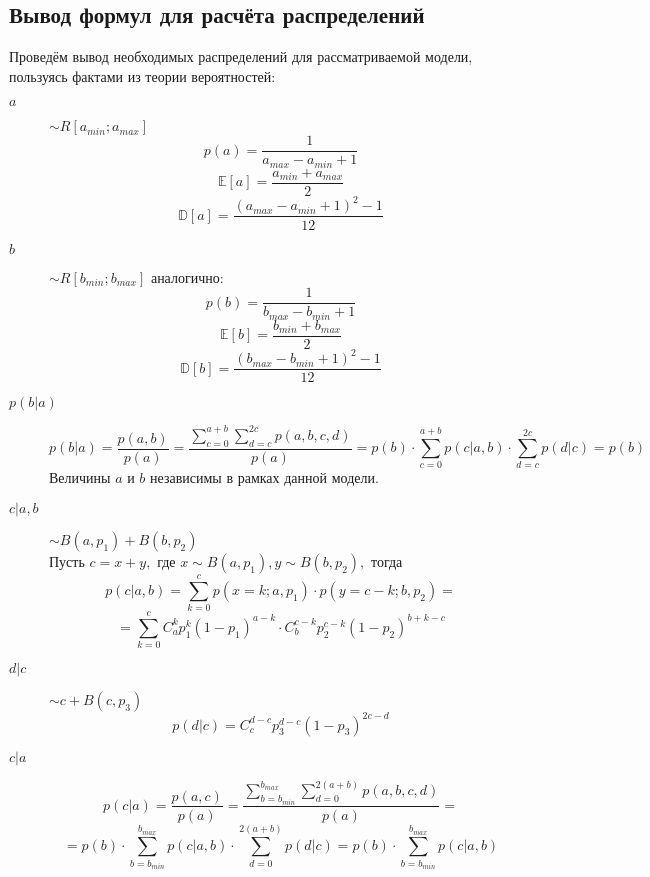 \documentclass[12pt,a4paper,oneside,fleqn,leqno]{article}
\begin{document}
		\subsection{Вывод формул для расчёта распределений}
			Проведём вывод необходимых распределений для рассматриваемой модели, пользуясь фактами из теории вероятностей:
			\begin{description}
				\item[$a$]
				$\sim R[a_{min}; a_{max}]$\\
				$$p(a) = \frac{1}{a_{max} - a_{min} + 1}$$
				$$\mathbb{E}[a] = \frac{a_{min} + a_{max}}{2}$$
				$$\mathbb{D}[a] = \frac{(a_{max} - a_{min} + 1)^2 - 1}{12}$$
				\noindent\makebox[\linewidth]{\rule{\textwidth}{0.4pt}}
				\item[$b$]
				$\sim R[b_{min}; b_{max}]$ аналогично:\\
				$$p(b) = \frac{1}{b_{max} - b_{min} + 1}$$
				$$\mathbb{E}[b] = \frac{b_{min} + b_{max}}{2}$$
				$$\mathbb{D}[b] = \frac{(b_{max} - b_{min} + 1)^2 - 1}{12}$$
				\noindent\makebox[\linewidth]{\rule{\textwidth}{0.4pt}}
				\item[$p(b|a)$]
				$$ p(b|a) = \frac{p(a, b)}{p(a)} = \frac{\sum\limits_{c = 0}^{a + b} \sum\limits_{d = c}^{2c} p(a, b, c, d)}{p(a)} = p(b) \cdot \sum\limits_{c = 0}^{a + b} p(c|a, b) \cdot \sum\limits_{d = c}^{2c} p(d|c) = p(b)$$
				Величины $a$ и $b$ независимы в рамках данной модели.\\
				\noindent\makebox[\linewidth]{\rule{\textwidth}{0.4pt}}
				\item[$c|a,b$]
				$\sim B(a, p_1) + B(b, p_2)$\\
				Пусть $c = x + y,$ где $x \sim B(a, p_1), y \sim B(b, p_2),$ тогда
				$$p(c|a,b) = \sum_{k = 0}^c p(x = k; a, p_1) \cdot p(y = c - k; b, p_2) = $$ $$
				=\sum_{k = 0}^c C_a^k p_1^k (1 - p_1)^{a - k} \cdot C_b^{c - k} p_2^{c - k} (1 - p_2)^{b + k - c}$$
				\noindent\makebox[\linewidth]{\rule{\textwidth}{0.4pt}}
				\item[$d|c$]
				$\sim c + B(c, p_3)$
				$$ p(d|c) = C_{c}^{d - c}p_3^{d - c}(1 - p_3)^{2c - d}$$
				\noindent\makebox[\linewidth]{\rule{\textwidth}{0.4pt}}
				\item[$c|a$]
				$$p(c|a) = \frac{p(a, c)}{p(a)} = \frac{\sum\limits_{b = b_{min}}^{b_{max}} \sum\limits_{d = 0}^{2(a + b)}p(a, b, c, d) }{p(a)} = $$ $$ = p(b) \cdot \sum\limits_{b = b_{min}}^{b_{max}} p(c|a, b) \cdot \sum\limits_{d = 0}^{2(a + b)}p(d|c) = p(b) \cdot \sum\limits_{b = b_{min}}^{b_{max}} p(c|a, b)$$
				\noindent\makebox[\linewidth]{\rule{\textwidth}{0.4pt}}

\end{description}
\end{document}
